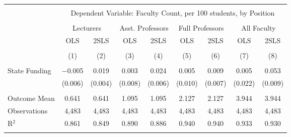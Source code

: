 
\begin{tabular}{@{\extracolsep{5pt}}lcccccccc} 
\\[-1.8ex]\hline 
\hline \\[-1.8ex] 
 & \multicolumn{8}{c}{Dependent Variable: Faculty Count, per 100 students, by Position} \\ 
\cline{2-9} 
\\[-1.8ex] & \multicolumn{2}{c}{Lecturers} & \multicolumn{2}{c}{Asst. Professors} & \multicolumn{2}{c}{Full Professors} & \multicolumn{2}{c}{All Faculty} \\ 
 & OLS & 2SLS & OLS & 2SLS & OLS & 2SLS & OLS & 2SLS \\ 
\\[-1.8ex] & (1) & (2) & (3) & (4) & (5) & (6) & (7) & (8)\\ 
\hline \\[-1.8ex] 
 State Funding & $-$0.005 & 0.019 & 0.003 & 0.024 & 0.005 & 0.009 & 0.005 & 0.053 \\ 
  & (0.006) & (0.004) & (0.008) & (0.006) & (0.010) & (0.007) & (0.022) & (0.009) \\ 
 \hline \\[-1.8ex] 
Outcome Mean & 0.641 & 0.641 & 1.095 & 1.095 & 2.127 & 2.127 & 3.944 & 3.944 \\ 
Observations & 4,483 & 4,483 & 4,483 & 4,483 & 4,483 & 4,483 & 4,483 & 4,483 \\ 
R$^{2}$ & 0.861 & 0.849 & 0.890 & 0.886 & 0.940 & 0.940 & 0.933 & 0.930 \\ 
\hline 
\hline \\[-1.8ex] 
\end{tabular} 
